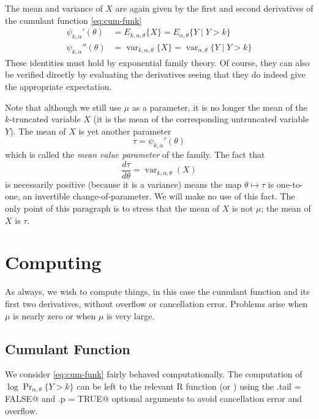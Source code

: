 \documentclass[11pt]{article}
\DeclareMathOperator{\var}{var}
\newcommand{\Prsub}[1]{\Pr\nolimits_{#1}}
\begin{document}
The mean and variance of $X$ are again given by the first and second
derivatives of the cumulant function \eqref{eq:cum-funk}
\begin{subequations}
\begin{align}
   \psi_{k, \alpha}'(\theta)
   & =
   E_{k, \alpha, \theta}\{ X \}
   =
   E_{\alpha, \theta}\{ Y \mid Y > k \}
   \label{eq:tau-funk}
   \\
   \psi_{k, \alpha}''(\theta)
   & =
   \var_{k, \alpha, \theta}\{ X \}
   =
   \var_{\alpha, \theta}\{ Y \mid Y > k \}
   \label{eq:tau-prime-funk}
\end{align}
\end{subequations}
These identities must hold by exponential family theory.
Of course, they can also be verified directly by evaluating the
derivatives seeing that they do indeed give the appropriate expectation.

Note that although we still use $\mu$ as a parameter, it is no longer
the mean of the $k$-truncated variable $X$ (it is the mean of the
corresponding untruncated variable $Y$).  The mean of $X$ is yet another
parameter
\begin{equation} \label{eq:mvp}
   \tau = \psi_{k, \alpha}'(\theta)
\end{equation}
which is called the \emph{mean value parameter} of the family.
The fact that
$$
   \frac{d \tau}{d \theta} = \var_{k, \alpha, \theta}(X)
$$
is necessarily positive (because it is a variance) means
the map $\theta \mapsto \tau$ is one-to-one, an invertible
change-of-parameter.  We will make no use of this fact.
The only point of this paragraph is to stress that
the mean of $X$ is not $\mu$; the mean of $X$ is $\tau$.

\section{Computing}

As always, we wish to compute things, in this case the cumulant function
and its first two derivatives, without overflow or cancellation error.
Problems arise when $\mu$ is nearly zero or when $\mu$ is very large.

\subsection{Cumulant Function}

We consider \eqref{eq:cum-funk} fairly behaved computationally.
The computation of $\log \Prsub{\alpha, \theta}\{Y > k\}$ can be left
to the relevant R function (\verb@ppois@ or \verb@pnbinom@) using
the \verb@lower.tail = FALSE@ and \verb@log.p = TRUE@ optional arguments
to avoid cancellation error and overflow.
\end{document}
